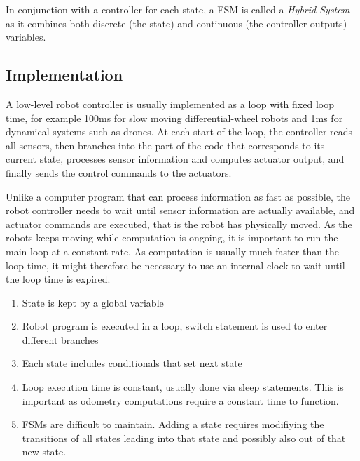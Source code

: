 In conjunction with a controller for each state, a FSM is called a \emph{Hybrid System}\cite{van2000introduction} as it combines both discrete (the state) and continuous (the controller outputs) variables. 

\subsection{Implementation}
A low-level robot controller is usually implemented as a loop with fixed loop time, for example 100ms for slow moving differential-wheel robots and 1ms for dynamical systems such as drones. At each start of the loop, the controller reads all sensors, then branches into the part of the code that corresponds to its current state, processes sensor information and computes actuator output, and finally sends the control commands to the actuators. 

Unlike a computer program that can process information as fast as possible, the robot controller needs to wait until sensor information are actually available, and actuator commands are executed, that is the robot has physically moved. As the robots keeps moving while computation is ongoing, it is important to run the main loop at a constant rate. As computation is usually much faster than the loop time, it might therefore be necessary to use an internal clock to wait until the loop time is expired. 





\begin{enumerate}
\item State is kept by a global variable
\item Robot program is executed in a loop, switch statement is used to enter different branches
\item Each state includes conditionals that set next state
\item Loop execution time is constant, usually done via sleep statements. This is important as odometry computations require a constant time to function.
\item FSMs are difficult to maintain. Adding a state requires modifiying the transitions of all states leading into that state and possibly also out of that new state.
\end{enumerate}

